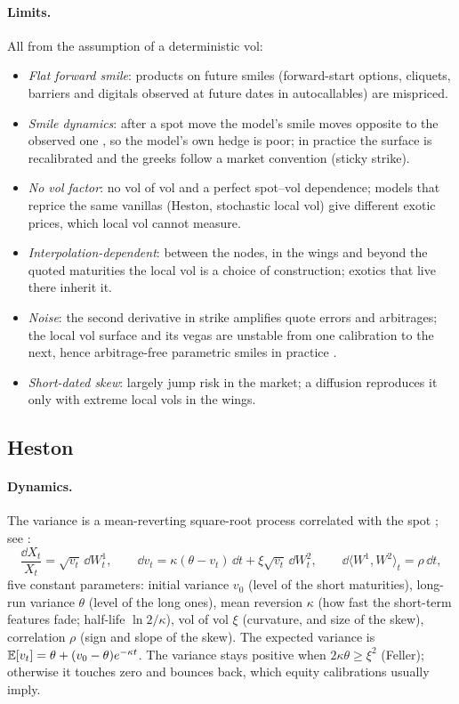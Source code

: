 \paragraph{Limits.} All from the assumption of a deterministic vol:
\begin{itemize}[nosep]
  \item \emph{Flat forward smile}: products on future smiles (forward-start options, cliquets, barriers and digitals
        observed at future dates in autocallables) are mispriced.
  \item \emph{Smile dynamics}: after a spot move the model's smile moves opposite to the observed one \citep{hagan2002}, so the
        model's own hedge is poor; in practice the surface is recalibrated and the greeks follow a market convention
        (sticky strike).
  \item \emph{No vol factor}: no vol of vol and a perfect spot--vol dependence; models that reprice the same vanillas
        (Heston, stochastic local vol) give different exotic prices, which local vol cannot measure.
  \item \emph{Interpolation-dependent}: between the nodes, in the wings and beyond the quoted maturities the local vol is a
        choice of construction; exotics that live there inherit it.
  \item \emph{Noise}: the second derivative in strike amplifies quote errors and arbitrages; the local vol surface and its
        vegas are unstable from one calibration to the next, hence arbitrage-free parametric smiles in practice
        \citep[SVI,][]{gatheral2006}.
  \item \emph{Short-dated skew}: largely jump risk in the market; a diffusion reproduces it only with extreme local vols in
        the wings.
\end{itemize}

\subsection{Heston}\label{sec:mp-heston}
\paragraph{Dynamics.} The variance is a mean-reverting square-root process correlated with the spot \citep{heston1993}; see \citet[ch.~8]{oosterlee2019}:
\[
  \frac{\dd X_t}{X_t} = \sqrt{v_t}\,\dd W^1_t,\qquad
  \dd v_t = \kappa(\theta - v_t)\,\dd t + \xi\sqrt{v_t}\,\dd W^2_t,\qquad \dd\langle W^1, W^2\rangle_t = \rho\,\dd t ,
\]
five constant parameters: initial variance $v_0$ (level of the short maturities), long-run variance $\theta$ (level of
the long ones), mean reversion $\kappa$ (how fast the short-term features fade; half-life $\ln 2/\kappa$), vol of vol $\xi$
(curvature, and size of the skew), correlation $\rho$ (sign and slope of the skew). The expected variance is
$\mathbb{E}[v_t] = \theta + (v_0 - \theta)e^{-\kappa t}$. The variance stays positive when $2\kappa\theta \ge \xi^2$ (Feller); otherwise it touches zero and
bounces back, which equity calibrations usually imply.

